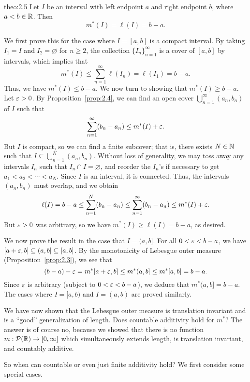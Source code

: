 \begin{theo}{theo:2.5}
    Let $I$ be an interval with left endpoint $a$ and right endpoint $b$, where 
    $a < b \in \mathbb{R}$. Then 
    \[ m^*(I) = \ell(I) = b-a. \]  
\end{theo}
\begin{pf}
    We first prove this for the case where $I = [a, b]$ is a compact interval. 
    By taking $I_1 = I$ and $I_2 = \varnothing$ for $n \geq 2$, the 
    collection $\{I_n\}_{n=1}^\infty$ is a cover of $[a, b]$ by intervals, 
    which implies that 
    \[ m^*(I) \leq \sum_{n=1}^\infty \ell(I_n) = \ell(I_1) = b-a. \] 
    Thus, we have $m^*(I) \leq b-a$. We now turn to showing that 
    $m^*(I) \geq b-a$. Let $\varepsilon > 0$. By Proposition~\ref{prop:2.4}, we can 
    find an open cover $\bigcup_{n=1}^\infty (a_n, b_n)$ of $I$ such that 
    \[ \sum_{n=1}^\infty (b_n - a_n) \leq m^*(I) + \varepsilon. \] 
    But $I$ is compact, so we can find a finite subcover; that is, 
    there exists $N \in \mathbb{N}$ such that $I \subseteq \bigcup_{n=1}^N (a_n, b_n)$. 
    Without loss of generality, we may toss away any intervals $I_n$ such that 
    $I_n \cap I = \varnothing$, and reorder the $I_n$'s if necessary to get 
    $a_1 < a_2 < \cdots < a_N$. Since $I$ is an interval, it is connected. 
    Thus, the intervals $(a_n, b_n)$ must overlap, and we obtain 
    \[ \ell(I) = b-a \leq \sum_{n=1}^N (b_n - a_n) \leq 
    \sum_{n=1}^\infty (b_n - a_n) \leq m^*(I) + \varepsilon. \] 
    But $\varepsilon > 0$ was arbitrary, so we have $m^*(I) \geq \ell(I) = b-a$, as 
    desired. 

    We now prove the result in the case that $I = (a, b]$. For all 
    $0 < \varepsilon < b-a$, we have $[a + \varepsilon, b] \subseteq (a, b] \subseteq 
    [a, b]$. By the monotonicity of Lebesgue outer measure 
    (Proposition~\ref{prop:2.3}), we see that 
    \[ (b-a) - \varepsilon = m^*[a + \varepsilon, b] \leq m^*(a, b] \leq m^*[a, b] = b-a. \] 
    Since $\varepsilon$ is arbitrary (subject to $0 < \varepsilon < b-a$), we deduce that 
    $m^*(a, b] = b-a$. The cases where $I = [a, b)$ and $I = (a, b)$ are 
    proved similarly. 
\end{pf}

We have now shown that the Lebesgue outer measure is translation invariant 
and is a ``good'' generalization of length. Does countable additivity hold 
for $m^*$? The answer is of course no, because we showed that there is 
no function $m : {\cal P}(\mathbb{R}) \to [0, \infty]$ which simultaneously 
extends length, is translation invariant, and countably additive. 

So when can countable or even just finite additivity hold? 
We first consider some special cases. 

